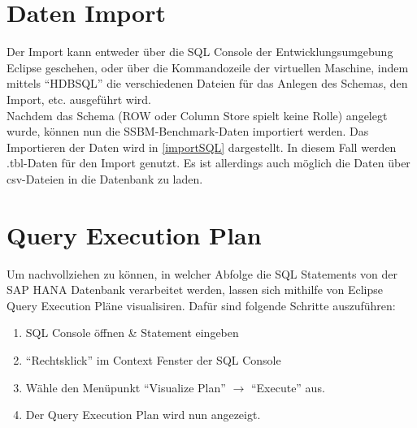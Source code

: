 \section{Daten Import}
Der Import kann entweder über die SQL Console der Entwicklungsumgebung Eclipse geschehen, oder über die Kommandozeile der virtuellen Maschine, indem mittels \enquote{HDBSQL} die verschiedenen Dateien für das Anlegen des Schemas, den Import, etc. ausgeführt wird.
\\Nachdem das Schema (ROW oder Column Store spielt keine Rolle) angelegt wurde, können nun die SSBM-Benchmark-Daten importiert werden. Das Importieren der Daten wird in \autoref{importSQL} dargestellt. In diesem Fall werden .tbl-Daten für den Import genutzt. Es ist allerdings auch möglich die Daten über csv-Dateien in die Datenbank zu laden.


\section{Query Execution Plan}
Um nachvollziehen zu können, in welcher Abfolge die SQL Statements von der SAP HANA Datenbank verarbeitet werden, lassen sich mithilfe von Eclipse Query Execution Pläne visualisiren.
Dafür sind folgende Schritte auszuführen:
\begin{enumerate}
	\item SQL Console öffnen \& Statement eingeben
	\item \enquote{Rechtsklick} im Context Fenster der SQL Console
	\item Wähle den Menüpunkt \enquote{Visualize Plan} $\rightarrow$ \enquote{Execute} aus.
	\item Der Query Execution Plan wird nun angezeigt.
\end{enumerate} 
